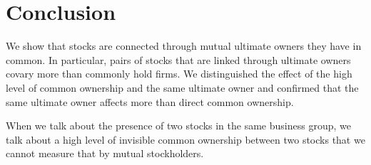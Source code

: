 \section{Conclusion}

	We show that stocks are connected through mutual ultimate owners they have in common. In particular, pairs of stocks that are linked through ultimate owners covary more than commonly hold firms. We distinguished the effect of the high level of common ownership and the same ultimate owner and confirmed that the same ultimate owner affects more than direct common ownership.
	
	When we talk about the presence of two stocks in the same business group, we talk about a high level of invisible common ownership between two stocks that we cannot measure that by mutual stockholders.
	



	{
	\footnotesize
		
		
	}





